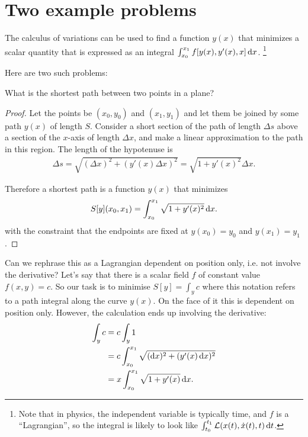 
\section{Two example problems}
The calculus of variations can be used to find a function $y(x)$ that minimizes a scalar quantity that is
expressed as an integral $\int_{x_0}^{x_1} f[y(x), y'(x), x] \dx$. \footnote{Note that in physics, the
  independent variable is typically time, and $f$ is a ``Lagrangian'', so the integral is likely to look
  like $\int_{t_0}^{t_1} \Lag(x(t), \xdot(t), t) \dt$.}

Here are two such problems:

\begin{question*}
  What is the shortest path between two points in a plane?
\end{question*}

\begin{proof}
  Let the points be $(x_0, y_0)$ and $(x_1, y_1)$ and let them be joined by some path $y(x)$ of length $S$.
  Consider a short section of the path of length $\Delta s$ above a section of the $x$-axis of
  length $\Delta x$, and make a linear approximation to the path in this region. The length of the hypotenuse
  is
  \begin{align*}
    \Delta s = \sqrt{(\Delta x)^2 + (y'(x)\Delta x)^2} = \sqrt{1 + y'(x)^2} \Delta x.
  \end{align*}

  Therefore a shortest path is a function $y(x)$ that minimizes
  \begin{align*}
    S[y](x_0, x_1) = \int_{x_0}^{x_1} \sqrt{1 + y'(x)^2}\dx.
  \end{align*}
  with the constraint that the endpoints are fixed at $y(x_0) = y_0$ and $y(x_1) = y_1$.

\end{proof}


Can we rephrase  this as a Lagrangian  dependent on position only,  i.e. not involve the  derivative? Let's say
that   there  is   a  scalar   field  $f$   of  constant   value   $f(x,  y)   =  c$.   So  our   task  is   to
minimise $S[y] = \int_{y} c$ where this notation refers to  a path integral along the curve $y(x)$. On the face
of it this is dependent on position only. However, the calculation ends up involving the derivative:
\begin{align*}
  \int_{y} c
  &= c\int_{y}1 \\
  &= c\int_{x_{0}}^{x_{1}}\sqrt{(\dx)^{2} + (y'(x)\dx)^{2}} \\
  &= x\int_{x_0}^{x_1} \sqrt{1 + y'(x)} \dx.
\end{align*}

